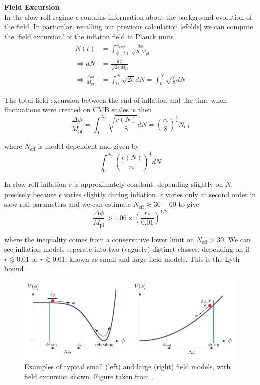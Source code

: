 \documentclass[a4paper,10pt]{article}
\newcommand{\Mp}{M_{\text{pl}}}
\newcommand{\half}{\frac{1}{2}}
\begin{document}
\textbf{Field Excursion}\\

In the slow roll regime $\epsilon$ contains information about the background evolution of the field. In particular, recalling our previous calculation \ref{efolds} we can compute the `field excursion' of the inflaton field in Planck units
\begin{equation}\begin{split}
N(t) &=  \int_{\phi(t)}^{\phi_{end}} \frac{d\phi}{\sqrt{2\epsilon}\Mp}\\
\Rightarrow dN&=\frac{d\phi}{\sqrt{2\epsilon}\Mp}\\
\Rightarrow \frac{\Delta \phi}{\Mp} &= \int_0^N \sqrt{2\epsilon} dN = \int_0^N \sqrt{\frac{r}{8}} dN 
\end{split}\end{equation}

The total field excursion between the end of inflation and the time when fluctuations were created on CMB scales is then 
\begin{equation}
\frac{\Delta \phi}{\Mp} =  \int_0^{N_*} \sqrt{\frac{r(N)}{8}} dN  = \left(\frac{r_*}{8}\right)^\half N_{\text{eff}}
\end{equation}

where $N_{\text{eff}}$ is model dependent and given by
\begin{equation}
\int_0^{N_*}\left(\frac{r(N)}{r_*}\right)^\half dN
\end{equation}

In slow roll inflation $r$ is approximately constant, depending slightly on $N$, precisely because $\epsilon$ varies slightly during inflation. $r$ varies only at second order in slow roll parameters and we can estimate  $N_{\text{eff}} \approx 30-60$ to give
\begin{equation}
\frac{\Delta \phi}{\Mp} > 1.06 \times \left(\frac{r_*}{0.01}\right)^{1/2}
\end{equation}

where the inequality comes from a conservative lower limit on $N_{\text{eff}} > 30$. We can see  inflation models seperate into two (vaguely) distinct classes, depending on if $r\lessapprox 0.01$ or $r\gtrapprox 0.01$, known as small and large field models. This is the Lyth bound \cite{Lyth}.\\


\begin{figure}[h]
  \includegraphics[width=0.7\linewidth]{smalllargefield.png}
  \centering
  \caption{Examples of typical small (left) and large (right) field models, with field excursion shown. Figure taken from \cite{baumannTASILecturesInflation2012}.}
\end{figure}
\end{document}
